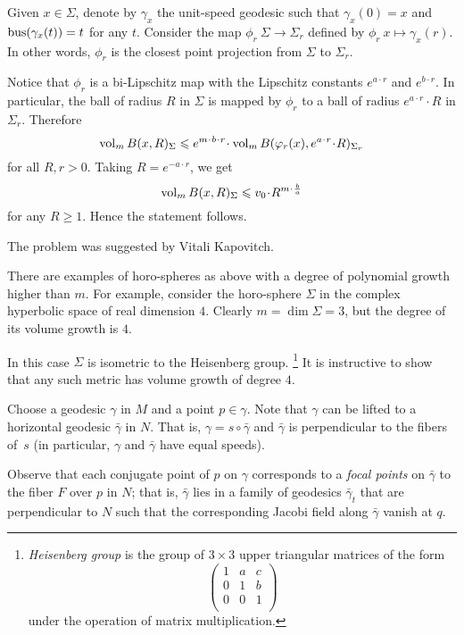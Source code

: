 Given $x\in \Sigma$, denote by $\gamma_x$ 
the unit-speed geodesic
such that $\gamma_x(0)=x$ and $\operatorname{\rm bus}\nolimits(\gamma_x(t))=t$ for any $t$.
Consider the map $\phi_{r}\:\Sigma\to\Sigma_r$ defined by
$\phi_r\:x\mapsto \gamma_x(r)$.
In other words, $\phi_{r}$ is the closest point projection from $\Sigma$ to $\Sigma_r$.

Notice that $\phi_r$ is a bi-Lipschitz map with the Lipschitz constants $e^{a\cdot r}$ and $e^{b\cdot r}$.
In particular, the ball of radius $R$ in $\Sigma$ is mapped by $\phi_r$
to a ball of radius $e^{a\cdot r}\cdot R$ in $\Sigma_r$.
Therefore
\[\vol_m B(x,R)_\Sigma
\le 
e^{m\cdot b\cdot r}\cdot \vol_m B(\phi_r(x),e^{a\cdot r}\cdot R)_{\Sigma_r}\]
for all $R,r>0$.
Taking $R=e^{-a\cdot r}$, we get
\[\vol_m B(x,R)_\Sigma\le v_0\cdot R^{m\cdot \frac ba}\]
for any $R\ge1$. 
Hence the statement follows.
\qeds

The problem was suggested by Vitali Kapovitch.

There are examples of horo-spheres as above with a degree of polynomial growth higher than $m$.
For example, consider the horo-sphere $\Sigma$ in the complex hyperbolic space 
of real dimension $4$.
Clearly $m=\dim \Sigma=3$, but the degree of its volume growth is $4$.

In this case $\Sigma$ is isometric to the Heisenberg group.%
\footnote{\emph{Heisenberg group}
is the group of $3\times3$ upper triangular matrices of the form
\[\begin{pmatrix}
 1 & a & c\\
 0 & 1 & b\\
 0 & 0 & 1\\
\end{pmatrix}\]
under the operation of matrix multiplication.} 
It is instructive to show that any such metric has volume  growth of degree $4$.

Choose a geodesic $\gamma$ in $M$ and a point $p\in \gamma$.
Note that $\gamma$ can be lifted to a horizontal geodesic $\bar\gamma$ in $N$.
That is, $\gamma=s\circ\bar\gamma$ and $\bar\gamma$ is perpendicular to the fibers of~$s$ (in particular, $\gamma$ and $\bar\gamma$ have equal speeds).

Observe that each conjugate point of $p$ on $\gamma$ corresponds to a \emph{focal points} on $\bar\gamma$ to the fiber $F$ over $p$ in $N$;
that is, $\bar\gamma$ lies in a family of geodesics $\bar\gamma_t$ that are perpendicular to $N$ 
such that the corresponding Jacobi field along $\bar\gamma$ vanish at $q$.

